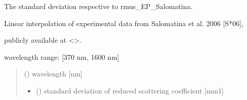 \documentclass[letterpaper,10pt,english]{sphinxmanual}
\begin{document}
\begin{fulllineitems}
\label{\detokenize{04_scattering_coefficient:skinoptics.scattering_coefficient.std_rmus_EP_Salomatina}}
\pysigstartsignatures
{}
\pysigstopsignatures
\begin{DUlineblock}{0em}
\item[] The standard deviation respective to rmus\_EP\_Salomatina.
\item[] Linear interpolation of experimental data from Salomatina et al. 2006 {[}S*06{]},
\item[] publicly available at \textless{}\textgreater{}.
\end{DUlineblock}

\begin{DUlineblock}{0em}
\item[] wavelength range: {[}370 nm, 1600 nm{]}
\end{DUlineblock}
\begin{quote}\begin{description}
\sphinxAtStartPar
{} () \textendash{} wavelength {[}nm{]}

\sphinxAtStartPar
\begin{itemize}
\item {} 
\sphinxAtStartPar
{} () \textendash{} standard deviation of reduced scattering coefficient {[}mm\sphinxhyphen{}1{]}

\end{itemize}


\end{description}\end{quote}

\end{fulllineitems}

\end{document}
